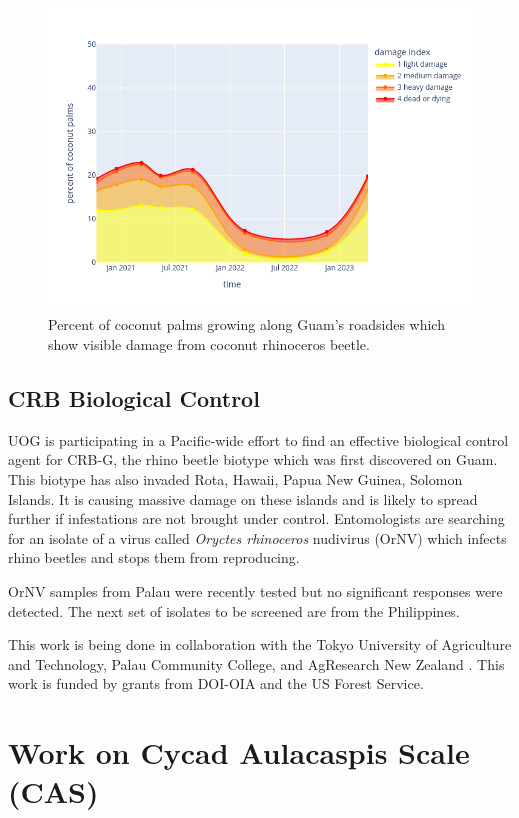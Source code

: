 \documentclass[twocolumn]{scrartcl}
\begin{document}
\begin{figure}[H]
	\centering
	\includegraphics[width=1\linewidth]{images/timeline}
	\caption{Percent of coconut palms growing along Guam's roadsides which show visible damage from coconut rhinoceros beetle.}
	\label{fig:timeline}
\end{figure}

\subsection{CRB Biological Control}

UOG is participating in a Pacific-wide effort to find an effective biological control agent for CRB-G, the rhino beetle biotype which was first discovered on Guam. This biotype has also invaded Rota, Hawaii, Papua New Guinea, Solomon Islands. It is causing massive damage on these islands and is likely to spread further if infestations are not brought under control. Entomologists are searching for an isolate of a virus called \textit{Oryctes rhinoceros} nudivirus (OrNV) which infects rhino beetles and stops them from reproducing.

OrNV samples from Palau were recently tested but no significant responses were detected. The next set of isolates to be screened are from the Philippines.

This work is being done in collaboration with the Tokyo University of Agriculture and Technology, Palau Community College, and AgResearch New Zealand \cite{hansonUOGTokyoUniversity}. This work is funded by grants from DOI-OIA and the US Forest Service.

\section{Work on Cycad Aulacaspis Scale (CAS)}
\end{document}
